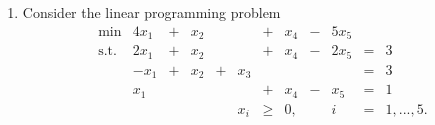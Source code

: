 \documentclass[12pt]{article}
\newcommand{\re}{I \!\! R}
\begin{document}
\begin{enumerate}
  \item  Consider the linear programming problem  \label{q.ray}
           \begin{displaymath}
             \begin{array}{lrcrcrcrcrcl}
      \min          & 4x_1 & + & x_2 &   &    & + & x_4 & - & 5x_5 \\
      \mbox{s.t. }  & 2x_1 & + & x_2 &   &    & + & x_4 & - & 2x_5 & = & 3 \\
                    & -x_1 & + & x_2 & + & x_3&   &     &   &      & = & 3 \\
                    &  x_1 &   &     &   &    & + & x_4 & - &  x_5 & = & 1 \\
                    &      &   &     &   & x_i& \geq & 0, & & i & = & 1,...,5.

\end{array}
\end{displaymath}
\end{enumerate}
\end{document}
